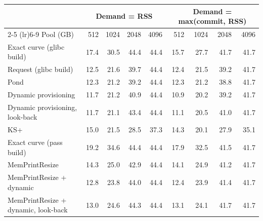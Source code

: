 \begin{tabular}{lrrrrrrrr}
\toprule
 & \multicolumn{4}{c}{Demand = RSS} & \multicolumn{4}{c}{Demand = max(commit, RSS)} \\
\cmidrule(lr){2-5} \cmidrule(lr){6-9}
Pool (GB) & 512 & 1024 & 2048 & 4096 & 512 & 1024 & 2048 & 4096 \\
\midrule
Exact curve (glibc build) & 17.4 & 30.5 & 44.4 & 44.4 & 15.7 & 27.7 & 41.7 & 41.7 \\
Request (glibc build) & 12.5 & 21.6 & 39.7 & 44.4 & 12.4 & 21.5 & 39.2 & 41.7 \\
Pond & 12.3 & 21.2 & 39.2 & 44.4 & 12.3 & 21.2 & 38.8 & 41.7 \\
Dynamic provisioning & 11.7 & 21.2 & 40.9 & 44.4 & 10.9 & 20.2 & 39.2 & 41.7 \\
Dynamic provisioning, look-back & 11.7 & 21.1 & 43.4 & 44.4 & 11.1 & 20.5 & 41.0 & 41.7 \\
KS+ & 15.0 & 21.5 & 28.5 & 37.3 & 14.3 & 20.1 & 27.9 & 35.1 \\
Exact curve (pass build) & 19.2 & 34.6 & 44.4 & 44.4 & 17.9 & 32.5 & 41.5 & 41.7 \\
MemPrintResize & 14.3 & 25.0 & 42.9 & 44.4 & 14.1 & 24.9 & 41.2 & 41.7 \\
MemPrintResize + dynamic & 12.8 & 23.8 & 44.0 & 44.4 & 12.4 & 23.9 & 41.4 & 41.7 \\
MemPrintResize + dynamic, look-back & 13.0 & 24.6 & 44.3 & 44.4 & 13.1 & 24.1 & 41.7 & 41.7 \\
\bottomrule
\end{tabular}
